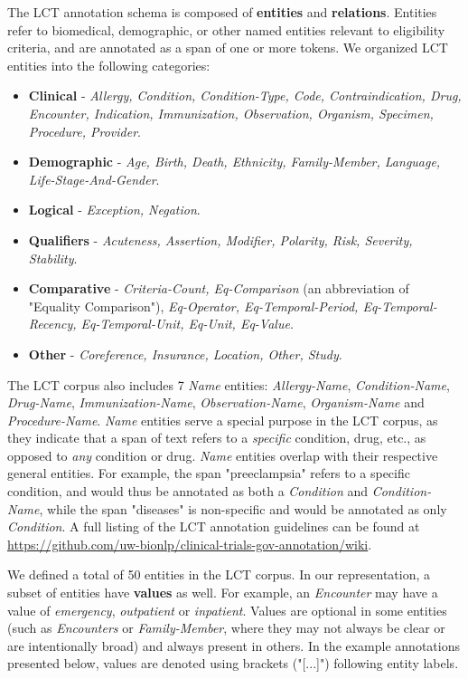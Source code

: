 \documentclass[../main.tex]{subfiles}
\begin{document}
The LCT annotation schema is composed of \textbf{entities} and 
\textbf{relations}. Entities refer to biomedical, demographic, or other named entities relevant to eligibility criteria, and are annotated as a span of one or more tokens. We organized LCT entities into the following categories:

\begin{itemize}
    \item \textbf{Clinical} - \textit{Allergy, Condition, Condition-Type, Code, Contraindication, Drug, Encounter, Indication, Immunization, Observation, Organism, Specimen, Procedure, Provider}. %
    \item \textbf{Demographic} - \textit{Age, Birth, Death, Ethnicity, Family-Member, Language, Life-Stage-And-Gender}. %
    \item \textbf{Logical} - \textit{Exception, Negation}. %
    \item \textbf{Qualifiers} - \textit{Acuteness, Assertion, Modifier, Polarity, Risk, Severity, Stability}. %
    \item \textbf{Comparative} - \textit{Criteria-Count, Eq-Comparison} (an abbreviation of "Equality Comparison"), \textit{Eq-Operator, Eq-Temporal-Period, Eq-Temporal-Recency, Eq-Temporal-Unit, Eq-Unit, Eq-Value}. %
    \item \textbf{Other} - \textit{Coreference, Insurance, Location, Other, Study}. %
\end{itemize}

The LCT corpus also includes 7 \textit{Name} entities: \textit{Allergy-Name}, \textit{Condition-Name}, \textit{Drug-Name}, \textit{Immunization-Name}, \textit{Observation-Name}, \textit{Organism-Name} and \textit{Procedure-Name}. \textit{Name} entities serve a special purpose in the LCT corpus, as they indicate that a span of text refers to a \textit{specific} condition, drug, etc., as opposed to \textit{any} condition or drug. \textit{Name} entities overlap with their respective general entities. For example, the span "preeclampsia" refers to a specific condition, and would thus be annotated as both a \textit{Condition} and \textit{Condition-Name}, while the span "diseases" is non-specific and would be annotated as only \textit{Condition}. A full listing of the LCT annotation guidelines can be found at \url{https://github.com/uw-bionlp/clinical-trials-gov-annotation/wiki}.

We defined a total of 50 entities in the LCT corpus. In our representation, a subset of entities have \textbf{values} as well. For example, an \textit{Encounter} may have a value of \textit{emergency}, \textit{outpatient} or \textit{inpatient}. Values are optional in some entities (such as \textit{Encounters} or \textit{Family-Member}, where they may not always be clear or are intentionally broad) and always present in others. In the example annotations presented below, values are denoted using brackets ("[...]") following entity labels.
\end{document}
